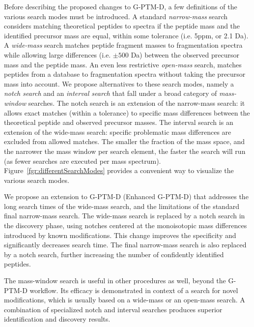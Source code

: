 \documentclass[journal=jprobs,manuscript=article]{achemso}
\begin{document}
Before describing the proposed changes to G-PTM-D, a few definitions of the various search modes must be introduced.
A standard \textit{narrow-mass} search considers matching theoretical peptides to spectra if the peptide mass and the identified precursor mass are equal, within some tolerance (i.e. 5ppm, or 2.1 Da).
A \textit{wide-mass} search matches peptide fragment masses to fragmentation spectra while allowing large differences (i.e. $\pm 500$ Da) between the observed precursor mass and the peptide mass.
An even less restrictive \textit{open-mass} search, matches peptides from a database to fragmentation spectra without taking the precursor mass into account.
We propose alternatives to these search modes, namely a \textit{notch search} and an \textit{interval search} that fall under a broad category of \textit{mass-window} searches.
The notch search is an extension of the narrow-mass search: it allows exact matches (within a tolerance) to specific mass differences between the theoretical peptide and observed precursor masses.
The interval search is an extension of the wide-mass search: specific problematic mass differences are excluded from allowed matches.
The smaller the fraction of the mass space, and the narrower the mass window per search element, the faster the search will run (as fewer searches are executed per mass spectrum).
Figure~\ref{fgr:differentSearchModes} provides a convenient way to visualize the various search modes.

We propose an extension to G-PTM-D (Enhanced G-PTM-D) that addresses the long search times of the wide-mass search, and the limitations of the standard final narrow-mass search.
The wide-mass search is replaced by a notch search in the discovery phase, using notches centered at the monoisotopic mass differences introduced by known modifications.
This change improves the specificity and significantly decreases search time.
The final narrow-mass search is also replaced by a notch search, further increasing the number of confidently identified peptides.

The mass-window search is useful in other procedures as well, beyond the G-PTM-D workflow.
Its efficacy is demonstrated in context of a search for novel modifications, which is usually based on a wide-mass or an open-mass search.
A combination of specialized notch and interval searches produces superior identification and discovery results.
\end{document}
